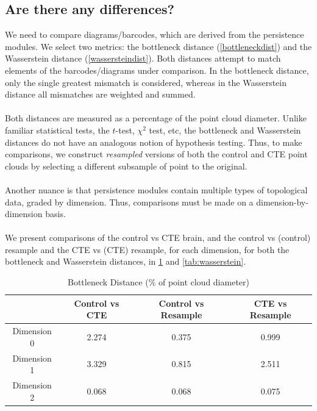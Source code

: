 \subsection{Are there any differences?}
We need to compare diagrams/barcodes, which are derived from the persistence modules. We select two metrics: the bottleneck distance (\cref{bottleneckdist}) and the Wasserstein distance (\cref{wassersteindist}). Both distances attempt to match elements of the barcodes/diagrams under comparison. In the bottleneck distance, only the single greatest mismatch is considered, whereas in the Wasserstein distance all mismatches are weighted and summed.
\\\\
Both distances are measured as a percentage of the point cloud diameter. Unlike familiar statistical tests, the $t$-test, $\chi^2$ test, etc, the bottleneck and Wasserstein distances do not have an analogous notion of hypothesis testing. Thus, to make comparisons, we construct \textit{resampled} versions of both the control and CTE point clouds by selecting a different subsample of point to the original. 
\\\\
Another nuance is that persistence modules contain multiple types of topological data, graded by dimension. Thus, comparisons must be made on a dimension-by-dimension basis.
\\\\
We present comparisons of the control vs CTE brain, and the control vs (control) resample and the CTE vs (CTE) resample, for each dimension, for both the bottleneck and Wasserstein distances, in \cref{tab:bottleneck} and \cref{tab:wasserstein}.
\begin{table}[h]
\centering
\begin{tabular}{|c|c|c|c|}
\hline
 & Control vs CTE & Control vs Resample & CTE vs Resample \\ \hline
Dimension 0 & 2.274 & 0.375 & 0.999 \\ \hline
Dimension 1 & 3.329 & 0.815 & 2.511 \\ \hline
Dimension 2 & 0.068 & 0.068 & 0.075 \\ \hline
\end{tabular}
\caption{Bottleneck Distance (\% of point cloud diameter)}
\label{tab:bottleneck}
\end{table}

